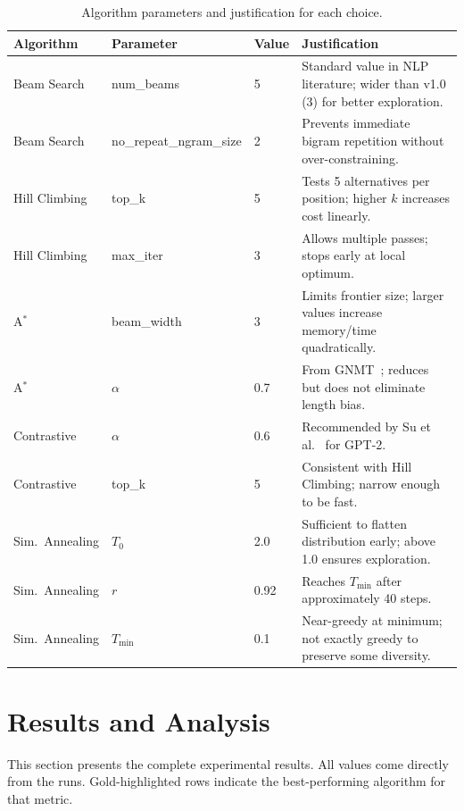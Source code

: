 \documentclass[12pt]{article}
\begin{document}
\begin{table}[ht]
	\centering
	\caption{Algorithm parameters and justification for each choice.}
	\label{tab:params}
	\renewcommand{\arraystretch}{1.2}
	\small
	\begin{tabularx}{\linewidth}{l l l X}
		\toprule
		\textbf{Algorithm} & \textbf{Parameter} & \textbf{Value} & \textbf{Justification} \\
		\midrule
		Beam Search & num\_beams & 5 & Standard value in NLP literature; wider than v1.0 (3) for better exploration. \\
		Beam Search & no\_repeat\_ngram\_size & 2 & Prevents immediate bigram repetition without over-constraining. \\
		Hill Climbing & top\_k & 5 & Tests 5 alternatives per position; higher $k$ increases cost linearly. \\
		Hill Climbing & max\_iter & 3 & Allows multiple passes; stops early at local optimum. \\
		A$^*$ & beam\_width & 3 & Limits frontier size; larger values increase memory/time quadratically. \\
		A$^*$ & $\alpha$ & 0.7 & From GNMT~\cite{wu2016gnmt}; reduces but does not eliminate length bias. \\
		Contrastive & $\alpha$ & 0.6 & Recommended by Su et al.~\cite{su2022contrastive} for GPT-2. \\
		Contrastive & top\_k & 5 & Consistent with Hill Climbing; narrow enough to be fast. \\
		Sim.\ Annealing & $T_0$ & 2.0 & Sufficient to flatten distribution early; above 1.0 ensures exploration. \\
		Sim.\ Annealing & $r$ & 0.92 & Reaches $T_{\min}$ after approximately 40 steps. \\
		Sim.\ Annealing & $T_{\min}$ & 0.1 & Near-greedy at minimum; not exactly greedy to preserve some diversity. \\
		\bottomrule
	\end{tabularx}
\end{table}
	\section{Results and Analysis}
	\label{sec:results}
	
	This section presents the complete experimental results. All values come directly from the runs. Gold-highlighted rows indicate the best-performing algorithm for that metric.
	
\end{document}
